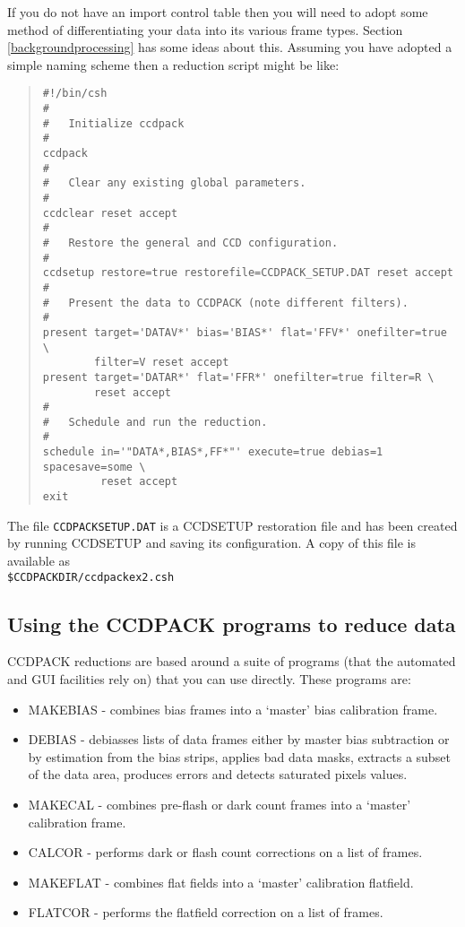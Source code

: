 \documentclass[twoside,11pt]{article}
\newcommand{\htmlref}[2]{#1}
\renewcommand{\_}{\texttt{\symbol{95}}}
\newenvironment{myquote}{\begin{quote}\begin{small}}{\end{small}\end{quote}}
\newcommand{\text}[1]{{\small \tt #1}}
\newcommand{\routine}[1]{{\sc #1}}
\newcommand{\xroutine}[1]{\htmlref{{\sc #1}}{#1}}
\begin{document}
If you do not have an import control table then you will need to adopt
some method of differentiating your data into its various frame
types. Section \ref{backgroundprocessing} has some ideas about this.
Assuming you have adopted a simple naming scheme then a reduction
script might be like:

\begin{center}
\end{center}
\begin{myquote}
\begin{verbatim}
#!/bin/csh
#
#   Initialize ccdpack
#
ccdpack
#
#   Clear any existing global parameters.
#
ccdclear reset accept
#
#   Restore the general and CCD configuration.
#
ccdsetup restore=true restorefile=CCDPACK_SETUP.DAT reset accept
#
#   Present the data to CCDPACK (note different filters).
#
present target='DATAV*' bias='BIAS*' flat='FFV*' onefilter=true \
        filter=V reset accept
present target='DATAR*' flat='FFR*' onefilter=true filter=R \
        reset accept
#
#   Schedule and run the reduction.
#
schedule in='"DATA*,BIAS*,FF*"' execute=true debias=1 spacesave=some \
         reset accept
exit
\end{verbatim}
\end{myquote}
The file \text{CCDPACK\_SETUP.DAT}
is a \xroutine{CCDSETUP} restoration file and has been created by
running \routine{CCDSETUP} and saving its configuration.
A copy of this file is available as \\
\text{\$CCDPACK\_DIR/ccdpack\_ex2.csh}

\subsection{Using the CCDPACK programs to reduce data}
CCDPACK reductions are based around a suite of programs (that the
automated and GUI facilities rely on) that you can use directly. These
programs are:
\begin{itemize}
\item \xroutine{MAKEBIAS} - combines bias frames into a `master' bias calibration
frame.
\item \xroutine{DEBIAS}   - debiasses lists of data frames either by master bias
subtraction or by estimation from the bias strips, applies bad data
masks, extracts a subset of the data area, produces errors and
detects saturated pixels values.
\item \xroutine{MAKECAL}  - combines pre-flash or dark count frames into a `master'
calibration frame.
\item \xroutine{CALCOR}   - performs dark or flash count corrections on a list of
frames.
\item \xroutine{MAKEFLAT} - combines flat fields into a `master' calibration
                 flatfield.
\item \xroutine{FLATCOR}  - performs the flatfield correction on a list of frames.
\end{itemize}
\end{document}
